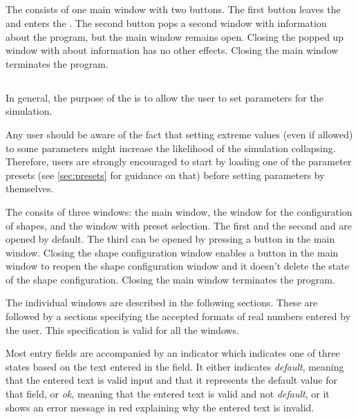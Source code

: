 \documentclass{article}
\newcommand{\vxlisp}{\vspace*{12pt}}
\begin{document}
\subsection{\Inull}\label{sec:i0}
The \inull{} consists of one main window with two buttons. The first button leaves the \inull{} and enters the \ione. The second button pops a second window with information about the program, but the main window remains open. Closing the popped up window with about information has no other effects. Closing the main window terminates the program.


\subsection{\Ione}\label{sec:i1}

In general, the purpose of the \ione{} is to allow the user to set parameters for the simulation.
\vxlisp

Any user should be aware of the fact that setting extreme values (even if allowed) to some parameters might increase the likelihood of the simulation collapsing. Therefore, users are strongly encouraged to start by loading one of the parameter presets (see \ref{sec:presets} for guidance on that) before setting parameters by themselves.
\vxlisp

The \ione{} consits of three windows: the main window, the window for the configuration of shapes, and the window with preset selection. The first and the second and are opened by default. The third can be opened by pressing a button in the main window. Closing the shape configuration window enables a button in the main window to reopen the shape configuration window and it doesn't delete the state of the shape configuration. Closing the main window terminates the program.
\vxlisp

The individual windows are described in the following sections. These are followed by a sections specifying the accepted formats of real numbers entered by the user. This specification is valid for all the windows.
\vxlisp

Most entry fields are accompanied by an indicator which indicates one of three states based on the text entered in the field. It either indicates \emph{default}, meaning that the entered text is valid input and that it represents the default value for that field, or \emph{ok}, meaning that the entered text is valid and not \emph{default}, or it shows an error message in red explaining why the entered text is invalid.
\end{document}
